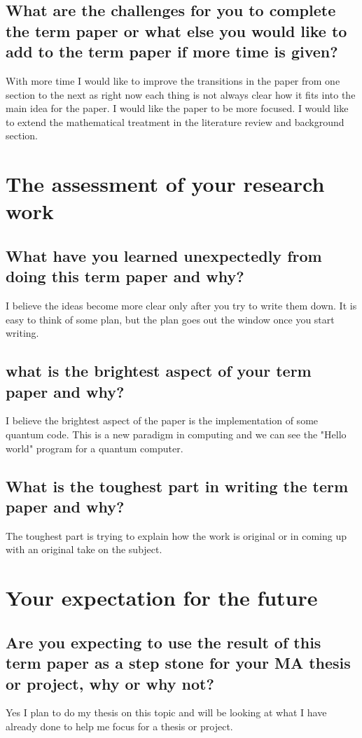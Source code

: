 \documentclass{article}
\begin{document}
\subsection{What are the challenges for you to complete the term paper or what else you would like to add to the term paper if more time is given?}
With more time I would like to improve the transitions in the paper from one section to the next as right now each thing is not always clear how it fits into the main idea for the paper. I would like the paper to be more focused. I would like to extend the mathematical treatment in the literature review and background section.

\section{The assessment of your research work}
\subsection{What have you learned unexpectedly from doing this term paper and why?}
I believe the ideas become more clear only after you try to write them down. It is easy to think of some plan, but the plan goes out the window once you start writing. 

\subsection{what is the brightest aspect of your term paper and why?}
I believe the brightest aspect of the paper is the implementation of some quantum code. This is a new paradigm in computing and we can see the "Hello world" program for a quantum computer. 

\subsection{What is the toughest part in writing the term paper and why?}
The toughest part is trying to explain how the work is original or in coming up with an original take on the subject. 

\section{Your expectation for the future}
\subsection{Are you expecting to use the result of this term paper as a step stone for your MA thesis or project, why or why not?}
Yes I plan to do my thesis on this topic and will be looking at what I have already done to help me focus for a thesis or project.
\end{document}

